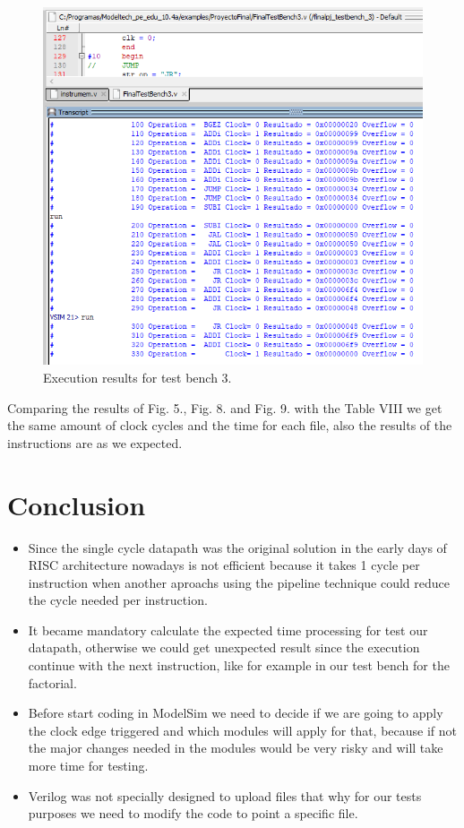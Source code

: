 \documentclass[conference]{IEEEtran}
\begin{document}
\begin{figure}[h]
\includegraphics[scale=0.5]{ModelSim_testbench3_clock_cycles.png}
\caption{Execution results for test bench 3.}
\label{result3}
\end{figure}

Comparing the results of Fig. 5., Fig. 8. and Fig. 9. with the Table VIII we get the same amount
of clock cycles and the time for each file, also the results of the instructions are as we expected.
 
\section{Conclusion}
\begin{itemize}
\item Since the single cycle datapath was the original solution in the early days of RISC architecture nowadays
is not efficient because it takes 1 cycle per instruction when another aproachs using the pipeline technique
could reduce the cycle needed per instruction. 
\item It became mandatory calculate the expected time processing for test our datapath, otherwise we could
get unexpected result since the execution continue with the next instruction, like for example in our test bench
for the factorial.
\item Before start coding in ModelSim we need to decide if we are going to apply the clock edge 
triggered and which modules will apply for that, because if not the major changes needed 
in the modules would be very risky and will take more time for testing.
\item Verilog was not specially designed to upload files that why for our tests purposes we need to
modify the code to point a specific file. 
\end{itemize}
\end{document}
